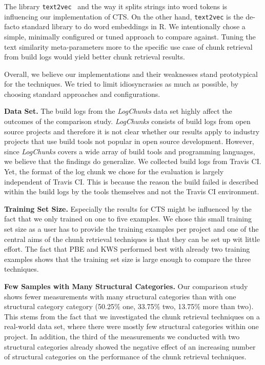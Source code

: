 The library
{\tt text2vec}~\cite{text2vec2019webpage}
and the way it splits strings into word tokens is influencing
our implementation of CTS\@.
On the other hand,
{\tt text2vec} is the de-facto standard library to do word embeddings
in R.
We intentionally chose a simple, minimally configured or tuned
approach to compare against.
Tuning the text similarity
meta-parameters more to the specific use case of chunk retrieval from
build logs would yield better chunk retrieval results.

Overall, we believe our implementations and their weaknesses stand
prototypical for the techniques.
We tried to limit idiosyncrasies as much as possible, by choosing
standard approaches and configurations.

\textbf{Data Set.}
The build logs from the \emph{LogChunks} data set highly affect
the outcomes of the comparison study.
\emph{LogChunks} consists of build
logs from open source projects and therefore it is not clear whether
our results apply to industry projects that use build tools
not popular in open source development.
However, since \emph{LogChunks} covers a wide array of build tools and
programming languages,
we believe that the findings do generalize.
We collected build logs from Travis CI.
Yet, the format of the log chunk we chose
for the evaluation is largely independent of Travis CI\@.
This
is because the reason the build failed is described within the build
logs by the tools themselves and not the Travis CI environment.

\textbf{Training Set Size.}
Especially the results for CTS might be influenced by the fact that we
only trained on one to five examples.
We chose this small training set
size as a user has to provide the training examples
per project and one of the central aims of the chunk
retrieval techniques is that they can be set up wit little effort.
The fact that PBE and KWS performed best with already two training
examples shows that the training set size is large enough to
compare the three techniques.

\textbf{Few Samples with Many Structural Categories.}
Our comparison study shows fewer measurements with many structural
categories than with one structural category category (50.25\% one,
33.75\% two, 13.75\% more than two).
This stems from the fact that we
investigated the chunk retrieval techniques on a real-world data set,
where there were mostly few structural categories within one project.
In addition, the third of the measurements we conducted with two
structural categories already showed the negative effect of an
increasing number of structural categories on the performance of the
chunk retrieval techniques.

